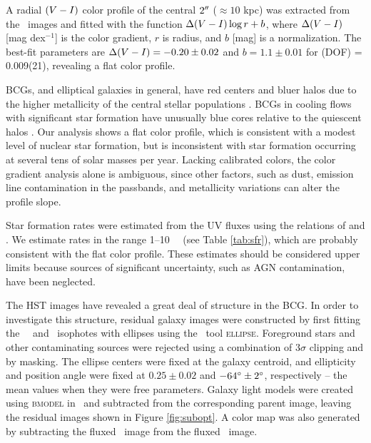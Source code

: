 \documentclass[apjpt4]{aastex}
\begin{document}
A radial $(V-I)$ color profile of the central $2\rm{^\prime}\hskip -0.1em\rm{^\prime}$ ($\approx
10$ kpc) was extracted from the \hst\ images and fitted with the
function $\Delta(V-I) \log r + b$, where $\Delta(V-I)$
[mag dex$^{-1}$] is the color gradient, $r$ is radius, and $b$ [mag]
is a normalization. The best-fit parameters are $\Delta(V-I) =
-0.20 \pm 0.02$ and $b = 1.1 \pm 0.01$ for \chisq(DOF) = 0.009(21),
revealing a flat color profile.

BCGs, and elliptical galaxies in general, have red centers and bluer
halos due to the higher metallicity of the central stellar populations
\citep{1990ApJS...73..637M}. BCGs in cooling flows with significant
star formation have unusually blue cores relative to the quiescent
halos \citep[\eg][]{rafferty06}. Our analysis shows a flat color
profile, which is consistent with a modest level of nuclear star
formation, but is inconsistent with star formation occurring at
several tens of solar masses per year. Lacking calibrated colors, the
color gradient analysis alone is ambiguous, since other factors, such
as dust, emission line contamination in the passbands, and metallicity
variations can alter the profile slope.

Star formation rates were estimated from the UV fluxes using the
relations of \citet{kennicutt2} and \citet{salim2007}. We estimate
rates in the range 1--10 ~\msolpy\ (see Table \ref{tab:sfr}), which
are probably consistent with the flat color profile. These estimates
should be considered upper limits because sources of significant
uncertainty, such as AGN contamination, have been neglected.

The HST images have revealed a great deal of structure in the BCG. In
order to investigate this structure, residual galaxy images were
constructed by first fitting the \hst\ \myv\ and \myi\ isophotes with
ellipses using the \iraf\ tool {\textsc{ellipse}}. Foreground stars
and other contaminating sources were rejected using a combination of
$3\sigma$ clipping and by masking. The ellipse centers were fixed at
the galaxy centroid, and ellipticity and position angle were fixed at
$0.25 \pm 0.02$ and $-64\rm{^{\circ}} \pm 2\rm{^{\circ}}$, respectively -- the mean
values when they were free parameters. Galaxy light models were
created using {\textsc{bmodel}} in \iraf\ and subtracted from the
corresponding parent image, leaving the residual images shown in
Figure \ref{fig:subopt}. A color map was also generated by subtracting
the fluxed \myi\ image from the fluxed \myv\ image.
\end{document}
